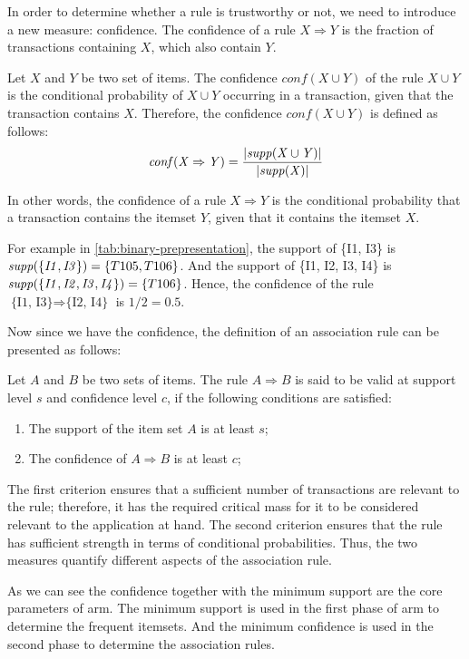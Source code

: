 In order to determine whether a rule is trustworthy or not, we need to introduce a new measure: confidence.
The confidence of a rule $X \Rightarrow Y$ is the fraction of transactions containing $X$, which also contain $Y$.
\begin{definition}
    Let $X$ and $Y$ be two set of items.
    The confidence $\mathit{conf}(X \cup Y)$ of the rule $X \cup Y$ is the conditional probability of $X \cup Y$ occurring in a transaction, given that the transaction contains $X$.
    Therefore, the confidence $\mathit{conf}(X \cup Y)$ is defined as follows:
    \begin{equation}
        \mathit{conf({X} \Rightarrow {Y})} = \frac{\lvert \mathit{supp({X \cup Y})} \rvert}{\lvert \mathit{supp({X})} \rvert}
    \end{equation}
\end{definition}
In other words, the confidence of a rule $X \Rightarrow Y$ is the conditional probability that a transaction contains the itemset $Y$, given that it contains the itemset $X$.

For example in \autoref{tab:binary-prepresentation}, the support of \{I1, I3\} is $\mathit{supp({\{I1, I3\}})} = \{T105, T106\}$.
And the support of \{I1, I2, I3, I4\} is $\mathit{supp({\{I1, I2, I3, I4\}})} = \{T106\}$.
Hence, the confidence of the rule $\text{\{I1, I3\}} \Rightarrow \text{\{I2, I4\}}$ is $1 / 2 = 0.5$.

Now since we have the confidence, the definition of an association rule can be presented as follows:
\begin{definition}
    Let $A$ and $B$ be two sets of items.
    The rule $A \Rightarrow B$ is said to be valid at support level $s$ and confidence level $c$, if the following conditions are satisfied:
    \begin{enumerate}
        \item The support of the item set $A$ is at least $s$;
        \item The confidence of $A \Rightarrow B$ is at least $c$;
    \end{enumerate}
    The first criterion ensures that a sufficient number of transactions are relevant to the rule; therefore, it has the required critical mass for it to be considered relevant to the application at hand.
    The second criterion ensures that the rule has sufficient strength in terms of conditional probabilities.
    Thus, the two measures quantify different aspects of the association rule.
\end{definition}
As we can see the confidence together with the minimum support are the core parameters of \acl{arm}.
The minimum support is used in the first phase of \acl{arm} to determine the frequent itemsets.
And the minimum confidence is used in the second phase to determine the association rules.

